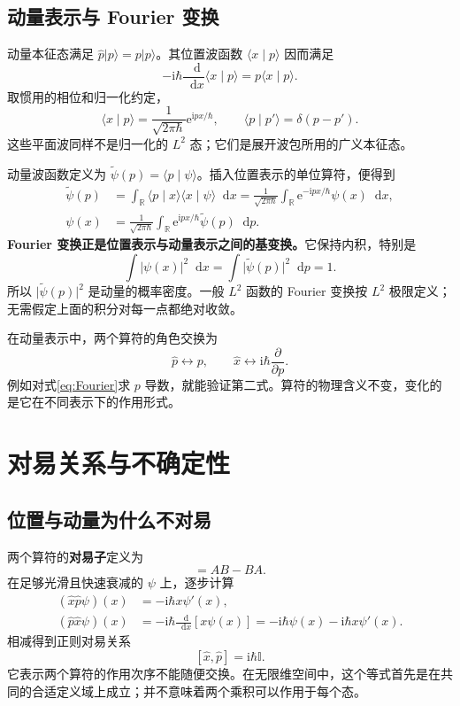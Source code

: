 \documentclass[a4paper,11pt]{article}
\numberwithin{equation}{section}
\newcommand{\ii}{\mathrm{i}}
\newcommand{\dd}{\mathop{}\!\mathrm{d}}
\newcommand{\ee}{\mathrm{e}}
\newcommand{\I}{\mathbb I}
\newcommand{\ket}[1]{\lvert #1\rangle}
\newcommand{\braket}[2]{\langle #1\mid #2\rangle}
\newcommand{\comm}[2]{[#1,#2]}
\newcommand{\abs}[1]{\lvert #1\rvert}
\begin{document}
\subsection{动量表示与 Fourier 变换}
动量本征态满足 $\hat p\ket{p}=p\ket{p}$。其位置波函数 $\braket{x}{p}$ 因而满足
\[
  -\ii\hbar\frac{\dd}{\dd x}\braket{x}{p}=p\braket{x}{p}.
\]
取惯用的相位和归一化约定，
\begin{equation}\label{eq:xpkernel}
  \braket{x}{p}=\frac1{\sqrt{2\pi\hbar}}\ee^{\ii px/\hbar},
  \qquad\braket{p}{p'}=\delta(p-p').
\end{equation}
这些平面波同样不是归一化的 $L^2$ 态；它们是展开波包所用的广义本征态。

动量波函数定义为 $\widetilde\psi(p)=\braket{p}{\psi}$。插入位置表示的单位算符，便得到
\begin{align}
  \widetilde\psi(p)
  &=\int_{\mathbb R}\braket{p}{x}\braket{x}{\psi}\dd x
  =\frac1{\sqrt{2\pi\hbar}}\int_{\mathbb R}
    \ee^{-\ii px/\hbar}\psi(x)\dd x,\label{eq:Fourier}\\
  \psi(x)
  &=\frac1{\sqrt{2\pi\hbar}}\int_{\mathbb R}
    \ee^{\ii px/\hbar}\widetilde\psi(p)\dd p.
\end{align}
\textbf{Fourier 变换正是位置表示与动量表示之间的基变换。}它保持内积，特别是
\[
  \int\abs{\psi(x)}^2\dd x
  =\int\abs{\widetilde\psi(p)}^2\dd p=1.
\]
所以 $\abs{\widetilde\psi(p)}^2$ 是动量的概率密度。一般 $L^2$ 函数的 Fourier 变换按 $L^2$ 极限定义；无需假定上面的积分对每一点都绝对收敛。

在动量表示中，两个算符的角色交换为
\begin{equation}
  \hat p\longleftrightarrow p,
  \qquad \hat x\longleftrightarrow\ii\hbar\frac{\partial}{\partial p}.
\end{equation}
例如对式\eqref{eq:Fourier}求 $p$ 导数，就能验证第二式。算符的物理含义不变，变化的是它在不同表示下的作用形式。

\section{对易关系与不确定性}
\subsection{位置与动量为什么不对易}
两个算符的\textbf{对易子}定义为
\begin{equation}
  \comm{A}{B}=AB-BA.
\end{equation}
在足够光滑且快速衰减的 $\psi$ 上，逐步计算
\begin{align}
  (\hat x\hat p\psi)(x)&=-\ii\hbar x\psi'(x),\\
  (\hat p\hat x\psi)(x)&=-\ii\hbar\frac{\dd}{\dd x}[x\psi(x)]
  =-\ii\hbar\psi(x)-\ii\hbar x\psi'(x).
\end{align}
相减得到正则对易关系
\begin{equation}\label{eq:CCR}
  \boxed{\comm{\hat x}{\hat p}=\ii\hbar\I.}
\end{equation}
它表示两个算符的作用次序不能随便交换。在无限维空间中，这个等式首先是在共同的合适定义域上成立；并不意味着两个乘积可以作用于每个态。
\end{document}
